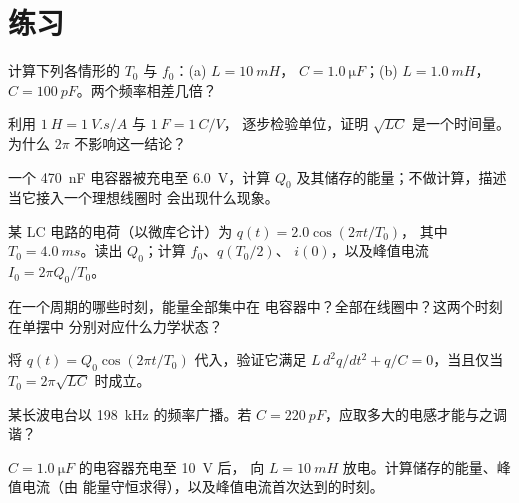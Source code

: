 \section{练习}

\begin{exercise}[$\star$]\label{exo:g12:rlc-oscillations:1}
计算下列各情形的 $T_0$ 与 $f_0$：(a) $L = \qty{10}{mH}$，
$C = \qty{1.0}{\micro F}$；(b) $L = \qty{1.0}{mH}$，
$C = \qty{100}{pF}$。两个频率相差几倍？
\end{exercise}

\begin{exercise}[$\star$]\label{exo:g12:rlc-oscillations:2}
利用 $\qty{1}{H} = \qty{1}{V.s/A}$ 与 $\qty{1}{F} = \qty{1}{C/V}$，
逐步检验单位，证明 $\sqrt{LC}$ 是一个时间量。为什么 $2\pi$
不影响这一结论？
\end{exercise}

\begin{exercise}[$\star$]\label{exo:g12:rlc-oscillations:3}
一个 \qty{470}{nF} 电容器被充电至 \qty{6.0}{V}，计算 $Q_0$
及其储存的能量；不做计算，描述当它接入一个理想线圈时
会出现什么现象。
\end{exercise}

\begin{exercise}[$\star$]\label{exo:g12:rlc-oscillations:4}
某 LC 电路的电荷（以微库仑计）为 $q(t) = 2.0\cos(2\pi t/T_0)$，
其中 $T_0 = \qty{4.0}{ms}$。读出 $Q_0$；计算 $f_0$、$q(T_0/2)$、
$i(0)$，以及峰值电流 $I_0 = 2\pi Q_0/T_0$。
\end{exercise}

\begin{exercise}[$\star$]\label{exo:g12:rlc-oscillations:5}
在一个周期的哪些时刻，能量全部集中在
电容器中？全部在线圈中？这两个时刻在单摆中
分别对应什么力学状态？
\end{exercise}

\begin{exercise}[$\star\star$]\label{exo:g12:rlc-oscillations:6}
将 $q(t) = Q_0\cos(2\pi t/T_0)$ 代入，验证它满足
$L\,d^2q/dt^2 + q/C = 0$，当且仅当 $T_0 = 2\pi\sqrt{LC}$ 时成立。
\end{exercise}

\begin{exercise}[$\star\star$]\label{exo:g12:rlc-oscillations:7}
某长波电台以 \qty{198}{kHz} 的频率广播。若
$C = \qty{220}{pF}$，应取多大的电感才能与之调谐？
\end{exercise}

\begin{exercise}[$\star\star$]\label{exo:g12:rlc-oscillations:8}
$C = \qty{1.0}{\micro F}$ 的电容器充电至 \qty{10}{V} 后，
向 $L = \qty{10}{mH}$ 放电。计算储存的能量、峰值电流（由
能量守恒求得），以及峰值电流首次达到的时刻。
\end{exercise}

